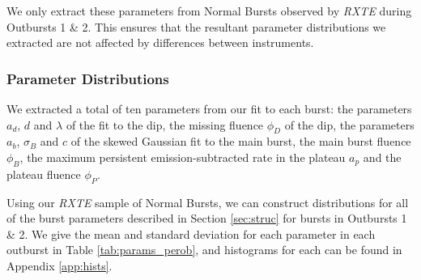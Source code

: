 \par We only extract these parameters from Normal Bursts observed by \textit{RXTE} during Outbursts 1 \& 2.  This ensures that the resultant parameter distributions we extracted are not affected by differences between instruments.

\subsubsection{Parameter Distributions}

\label{sec:hists}

\par We extracted a total of ten parameters from our fit to each burst: the parameters $a_d$, $d$ and $\lambda$ of the fit to the dip, the missing fluence $\phi_D$ of the dip, the parameters $a_b$, $\sigma_B$ and $c$ of the skewed Gaussian fit to the main burst, the main burst fluence $\phi_B$, the maximum persistent emission-subtracted rate in the plateau $a_p$ and the plateau fluence $\phi_P$.
\par Using our \textit{RXTE} sample of Normal Bursts, we can construct distributions for all of the burst parameters described in Section \ref{sec:struc} for bursts in Outbursts 1 \& 2.  We give the mean and standard deviation for each parameter in each outburst in Table \ref{tab:params_perob}, and histograms for each can be found in Appendix \ref{app:hists}.

